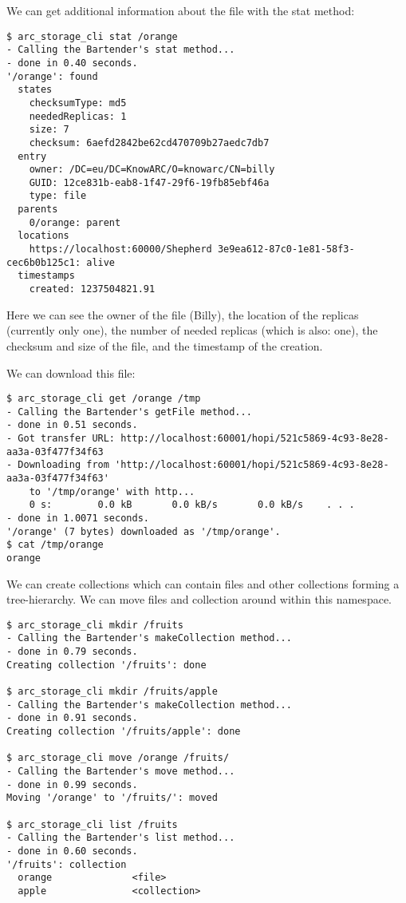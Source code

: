 \documentclass{book}
\begin{document}
We can get additional information about the file with the stat method:

\begin{verbatim}
$ arc_storage_cli stat /orange
- Calling the Bartender's stat method...
- done in 0.40 seconds.
'/orange': found
  states
    checksumType: md5
    neededReplicas: 1
    size: 7
    checksum: 6aefd2842be62cd470709b27aedc7db7
  entry
    owner: /DC=eu/DC=KnowARC/O=knowarc/CN=billy
    GUID: 12ce831b-eab8-1f47-29f6-19fb85ebf46a
    type: file
  parents
    0/orange: parent
  locations
    https://localhost:60000/Shepherd 3e9ea612-87c0-1e81-58f3-cec6b0b125c1: alive
  timestamps
    created: 1237504821.91
\end{verbatim}

Here we can see the owner of the file (Billy), the location of the replicas (currently only one), the number of needed replicas (which is also: one), the checksum and size of the file, and the timestamp of the creation.

We can download this file:

\begin{verbatim}
$ arc_storage_cli get /orange /tmp
- Calling the Bartender's getFile method...
- done in 0.51 seconds.
- Got transfer URL: http://localhost:60001/hopi/521c5869-4c93-8e28-aa3a-03f477f34f63
- Downloading from 'http://localhost:60001/hopi/521c5869-4c93-8e28-aa3a-03f477f34f63'
    to '/tmp/orange' with http...
    0 s:        0.0 kB       0.0 kB/s       0.0 kB/s    . . .       
- done in 1.0071 seconds.
'/orange' (7 bytes) downloaded as '/tmp/orange'.
$ cat /tmp/orange 
orange
\end{verbatim}

We can create collections which can contain files and other collections forming a tree-hierarchy. We can move files and collection around within this namespace.

\begin{verbatim}
$ arc_storage_cli mkdir /fruits
- Calling the Bartender's makeCollection method...
- done in 0.79 seconds.
Creating collection '/fruits': done

$ arc_storage_cli mkdir /fruits/apple
- Calling the Bartender's makeCollection method...
- done in 0.91 seconds.
Creating collection '/fruits/apple': done

$ arc_storage_cli move /orange /fruits/
- Calling the Bartender's move method...
- done in 0.99 seconds.
Moving '/orange' to '/fruits/': moved

$ arc_storage_cli list /fruits
- Calling the Bartender's list method...
- done in 0.60 seconds.
'/fruits': collection
  orange              <file>
  apple               <collection>
\end{verbatim}
\end{document}
